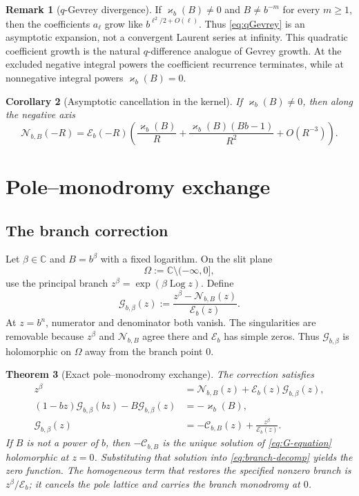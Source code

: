 \documentclass[11pt]{article}
\newtheorem{theorem}{Theorem}[section]
\newtheorem{corollary}[theorem]{Corollary}
\theoremstyle{definition}
\newtheorem{remark}[theorem]{Remark}
\newcommand{\Nker}{\mathscr{N}}
\newcommand{\Eker}{\mathscr{E}}
\newcommand{\Cker}{\mathscr{C}}
\newcommand{\Gker}{\mathscr{G}}
\newcommand{\kk}{\varkappa}
\newcommand{\C}{\mathbb{C}}
\newcommand{\Log}{\operatorname{Log}}
\begin{document}
\begin{remark}[$q$-Gevrey divergence]
If $\kk_b(B)\ne0$ and $B\ne b^{-m}$ for every $m\ge1$, then the coefficients $a_\ell$
grow like $b^{\ell^2/2+O(\ell)}$.  Thus \eqref{eq:qGevrey} is an asymptotic expansion, not
a convergent Laurent series at infinity.  This quadratic coefficient growth is the natural
$q$-difference analogue of Gevrey growth.  At the excluded negative integral powers the
coefficient recurrence terminates, while at nonnegative integral powers $\kk_b(B)=0$.
\end{remark}

\begin{corollary}[Asymptotic cancellation in the kernel]\label{cor:N-asymptotic}
If $\kk_b(B)\ne0$, then along the negative axis
\begin{equation}\label{eq:N-over-E}
 \Nker_{b,B}(-R)
 =\Eker_b(-R)\left(\frac{\kk_b(B)}R
 +\frac{\kk_b(B)(Bb-1)}{R^2}
 +O(R^{-3})\right).
\end{equation}
\end{corollary}

\section{Pole--monodromy exchange}

\subsection{The branch correction}

Let $\beta\in\C$ and $B=b^\beta$ with a fixed logarithm.  On the slit plane
\[
 \Omega:=\C\setminus(-\infty,0],
\]
use the principal branch $z^\beta=\exp(\beta\Log z)$.  Define
\begin{equation}\label{eq:G-def}
 \Gker_{b,\beta}(z)
 :=\frac{z^\beta-\Nker_{b,B}(z)}{\Eker_b(z)}.
\end{equation}
At $z=b^n$, numerator and denominator both vanish.  The singularities are removable because $z^\beta$ and $\Nker_{b,B}$ agree there and $\Eker_b$ has simple zeros.  Thus $\Gker_{b,\beta}$ is holomorphic on $\Omega$ away from the branch point $0$.

\begin{theorem}[Exact pole--monodromy exchange]\label{thm:pole-monodromy}
The correction satisfies
\begin{align}
 z^\beta
 &=\Nker_{b,B}(z)+\Eker_b(z)\Gker_{b,\beta}(z),
 \label{eq:branch-decomp}\\
 (1-bz)\Gker_{b,\beta}(bz)-B\Gker_{b,\beta}(z)
 &=-\kk_b(B),\label{eq:G-equation}\\
 \Gker_{b,\beta}(z)
 &=-\Cker_{b,B}(z)+\frac{z^\beta}{\Eker_b(z)}.
 \label{eq:G-C}
\end{align}
If $B$ is not a power of $b$, then $-\Cker_{b,B}$ is the unique solution of \eqref{eq:G-equation} holomorphic at $z=0$.  Substituting that solution into \eqref{eq:branch-decomp} yields the zero function.  The homogeneous term that restores the specified nonzero branch is $z^\beta/\Eker_b$; it cancels the pole lattice and carries the branch monodromy at $0$.
\end{theorem}
\end{document}
